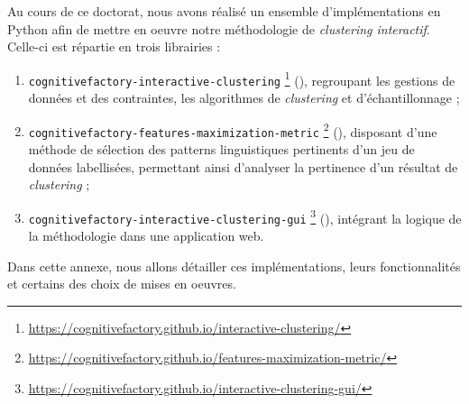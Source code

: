 \label{annex:C-ANNEXE-IMPLEMENTATIONS}

	Au cours de ce doctorat, nous avons réalisé un ensemble d'implémentations en Python afin de mettre en oeuvre notre méthodologie de \textit{clustering interactif}.
	Celle-ci est répartie en trois librairies :
	\begin{enumerate}
		\item \texttt{cognitivefactory-interactive-clustering} \footnote{
			\url{https://cognitivefactory.github.io/interactive-clustering/}
		} (\cite{schild:2022:cognitivefactory-interactiveclustering}), regroupant les gestions de données et des contraintes, les algorithmes de \textit{clustering} et d'échantillonnage ;
		\item \texttt{cognitivefactory-features-maximization-metric} \footnote{
			\url{https://cognitivefactory.github.io/features-maximization-metric/}
		} (\cite{schild:2023:cognitivefactory-featuresmaximizationmetric}), disposant d'une méthode de sélection des patterns linguistiques pertinents d'un jeu de données labellisées, permettant ainsi d'analyser la pertinence d'un résultat de \textit{clustering} ;
		\item \texttt{cognitivefactory-interactive-clustering-gui} \footnote{
			\url{https://cognitivefactory.github.io/interactive-clustering-gui/}
		} (\cite{schild-etal:2022:cognitivefactory-interactiveclusteringgui}), intégrant la logique de la méthodologie dans une application web.
	\end{enumerate}
	
	Dans cette annexe, nous allons détailler ces implémentations, leurs fonctionnalités et certains des choix de mises en oeuvres.
	
